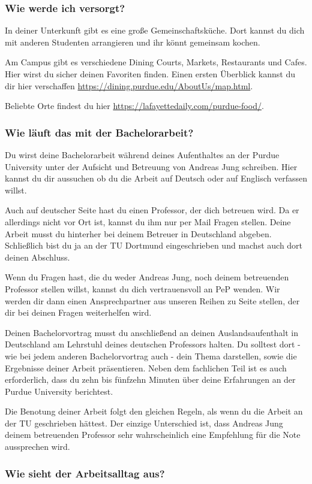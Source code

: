 \documentclass[
  paper=a4,
  fontsize=12pt,
  DIV=16,
  headheight=52pt,
  footheight=45pt,
  headinclude,
  parskip=full,
]{scrartcl}
\begin{document}
\subsubsection*{Wie werde ich versorgt?}
In deiner Unterkunft gibt es eine große Gemeinschaftsküche.
Dort kannst du dich mit anderen Studenten arrangieren und ihr könnt gemeinsam
kochen.

Am Campus gibt es verschiedene Dining Courts, Markets, Restaurants und Cafes.
Hier wirst du sicher deinen Favoriten finden.
Einen ersten Überblick kannst du dir hier verschaffen
\url{https://dining.purdue.edu/AboutUs/map.html}.

Beliebte Orte findest du hier \url{https://lafayettedaily.com/purdue-food/}.

\subsubsection*{Wie läuft das mit der Bachelorarbeit?}
Du wirst deine Bachelorarbeit während deines Aufenthaltes an der Purdue
University unter der Aufsicht und Betreuung von Andreas Jung schreiben.
Hier kannst du dir aussuchen ob du die Arbeit auf Deutsch oder auf Englisch
verfassen willst.

Auch auf deutscher Seite hast du einen Professor, der dich betreuen wird.
Da er allerdings nicht vor Ort ist, kannst du ihm nur per Mail Fragen stellen.
Deine Arbeit musst du hinterher bei deinem Betreuer in Deutschland abgeben.
Schließlich bist du ja an der TU Dortmund eingeschrieben und machst auch dort
deinen Abschluss.

Wenn du Fragen hast, die du weder Andreas Jung, noch deinem betreuenden Professor
stellen willst, kannst du dich vertrauensvoll an PeP wenden.
Wir werden dir dann einen Ansprechpartner aus unseren Reihen zu Seite stellen,
der dir bei deinen Fragen weiterhelfen wird.

Deinen Bachelorvortrag musst du anschließend an deinen Auslandsaufenthalt in
Deutschland am Lehrstuhl deines deutschen Professors halten.
Du solltest dort - wie bei jedem anderen Bachelorvortrag auch - dein Thema
darstellen, sowie die Ergebnisse deiner Arbeit präsentieren.
Neben dem fachlichen Teil ist es auch erforderlich, dass du zehn bis fünfzehn
Minuten über deine Erfahrungen an der Purdue University berichtest.

Die Benotung deiner Arbeit folgt den gleichen Regeln, als wenn du die Arbeit an
der TU geschrieben hättest.
Der einzige Unterschied ist, dass Andreas Jung deinem betreuenden Professor
sehr wahrscheinlich eine Empfehlung für die Note aussprechen wird.

\subsubsection*{Wie sieht der Arbeitsalltag aus?}
\end{document}
